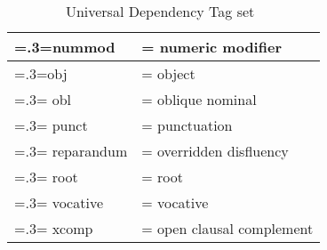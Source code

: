 \begin{table}[H]
\begin{tabularx}{0.8\textwidth}{|>{\hsize=.3\hsize\linewidth=\hsize}X|>{\hsize=0.7\hsize\linewidth=\hsize}X|}
        \hline
        nummod & numeric modifier \\
        \hline
        obj & object \\
        \hline
        obl & oblique nominal \\
        \hline
        punct & punctuation \\
        \hline
        reparandum & overridden disfluency \\
        \hline
        root & root \\
        \hline
        vocative & vocative \\
        \hline
        xcomp & open clausal complement \\
    \hline
    \end{tabularx}
    \caption{Universal Dependency Tag set~\cite{universal_deps}}
    \label{appendix:deps}
    \end{table}